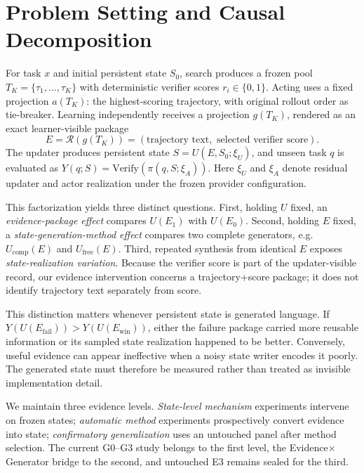 \section{Problem Setting and Causal Decomposition}

For task $x$ and initial persistent state $S_0$, search produces a frozen pool $T_K=\{\tau_1,\ldots,\tau_K\}$ with deterministic verifier scores $r_i\in\{0,1\}$. Acting uses a fixed projection $a(T_K)$: the highest-scoring trajectory, with original rollout order as tie-breaker. Learning independently receives a projection $g(T_K)$, rendered as an exact learner-visible package
\begin{equation}
E=\mathcal{R}(g(T_K))=(\text{trajectory text},\text{ selected verifier score}).
\end{equation}
The updater produces persistent state $S=U(E,S_0;\xi_U)$, and unseen task $q$ is evaluated as $Y(q;S)=\mathrm{Verify}(\pi(q,S;\xi_A))$. Here $\xi_U$ and $\xi_A$ denote residual updater and actor realization under the frozen provider configuration.

This factorization yields three distinct questions. First, holding $U$ fixed, an \emph{evidence-package effect} compares $U(E_1)$ with $U(E_0)$. Second, holding $E$ fixed, a \emph{state-generation-method effect} compares two complete generators, e.g. $U_{\mathrm{comp}}(E)$ and $U_{\mathrm{free}}(E)$. Third, repeated synthesis from identical $E$ exposes \emph{state-realization variation}. Because the verifier score is part of the updater-visible record, our evidence intervention concerns a trajectory+score package; it does not identify trajectory text separately from score.

This distinction matters whenever persistent state is generated language. If $Y(U(E_{\mathrm{fail}}))>Y(U(E_{\mathrm{win}}))$, either the failure package carried more reusable information or its sampled state realization happened to be better. Conversely, useful evidence can appear ineffective when a noisy state writer encodes it poorly. The generated state must therefore be measured rather than treated as invisible implementation detail.

We maintain three evidence levels. \emph{State-level mechanism} experiments intervene on frozen states; \emph{automatic method} experiments prospectively convert evidence into state; \emph{confirmatory generalization} uses an untouched panel after method selection. The current G0--G3 study belongs to the first level, the Evidence$\times$Generator bridge to the second, and untouched E3 remains sealed for the third.


